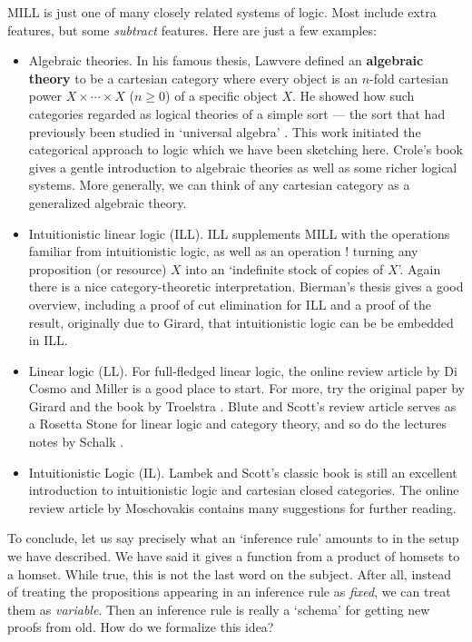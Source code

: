 \documentclass[12pt]{article}
\begin{document}
MILL is just one of many closely related systems of logic.  Most 
include extra features, but some {\it subtract} features.  
Here are just a few examples:

\begin{itemize}
\item Algebraic theories.   In his famous thesis, Lawvere \cite{Lawvere}
defined an {\bf algebraic theory} to be a cartesian category where 
every object is an $n$-fold cartesian power $X \times \cdots \times X$ 
($n \ge 0$) of a specific object $X$.  He showed how such categories 
regarded as logical theories of a simple sort --- the sort that had 
previously been studied in `universal algebra' \cite{BurrisS}.  This 
work initiated the categorical approach to logic which we have been
sketching here.  Crole's book \cite{Crole} gives a gentle introduction 
to algebraic theories as well as some richer logical systems.
More generally, we can think of any cartesian category as a
generalized algebraic theory. 
\item Intuitionistic linear logic (ILL).  ILL
supplements MILL with the operations familiar from intuitionistic
logic, as well as an operation $!$ turning any proposition (or 
resource) $X$ into an `indefinite stock of copies of $X$'.  Again 
there is a nice category-theoretic interpretation.  Bierman's 
thesis \cite{BiermanThesis} gives a good overview, including a proof 
of cut elimination for ILL and a proof of the result, originally due 
to Girard, that intuitionistic logic can be be embedded in ILL.
\item Linear logic (LL).  For full-fledged linear logic, 
the online review article by Di Cosmo and Miller \cite{dCM} is
a good place to start.  For more, try the original
paper by Girard \cite{Girard1} and the book by Troelstra \cite{Troelstra}.
Blute and Scott's review article \cite{BS} serves as a Rosetta Stone 
for linear logic and category theory, and so do the lectures notes
by Schalk \cite{Schalk}.  
\item Intuitionistic Logic (IL).   Lambek and 
Scott's classic book \cite{LS} is still an excellent introduction to 
intuitionistic logic and cartesian closed categories.  The online review 
article by Moschovakis \cite{Moschovakis} contains many suggestions for 
further reading.
\end{itemize}

To conclude, let us say precisely what an `inference rule' amounts to
in the setup we have described.  We have said it gives a function from
a product of homsets to a homset.  While true, this is not the last
word on the subject.  After all, instead of treating the propositions
appearing in an inference rule as {\it fixed}, we can treat them as
{\it variable}.  Then an inference rule is really a `schema' for
getting new proofs from old.  How do we formalize this idea?
\end{document}
